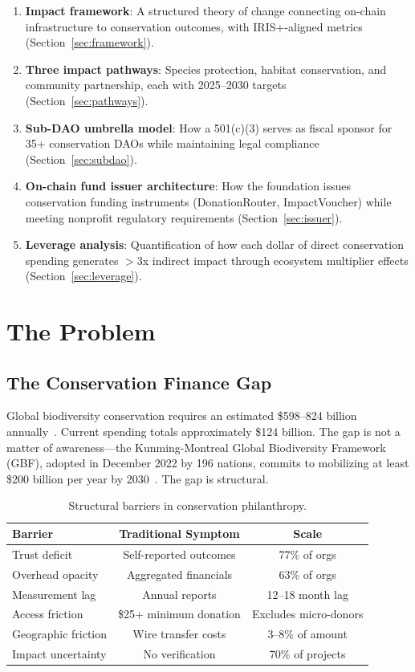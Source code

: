 \documentclass[11pt,letterpaper]{article}
\begin{document}
\begin{enumerate}
    \item \textbf{Impact framework}: A structured theory of change connecting on-chain infrastructure to conservation outcomes, with IRIS+-aligned metrics (Section~\ref{sec:framework}).
    \item \textbf{Three impact pathways}: Species protection, habitat conservation, and community partnership, each with 2025--2030 targets (Section~\ref{sec:pathways}).
    \item \textbf{Sub-DAO umbrella model}: How a 501(c)(3) serves as fiscal sponsor for 35+ conservation DAOs while maintaining legal compliance (Section~\ref{sec:subdao}).
    \item \textbf{On-chain fund issuer architecture}: How the foundation issues conservation funding instruments (DonationRouter, ImpactVoucher) while meeting nonprofit regulatory requirements (Section~\ref{sec:issuer}).
    \item \textbf{Leverage analysis}: Quantification of how each dollar of direct conservation spending generates $>$3x indirect impact through ecosystem multiplier effects (Section~\ref{sec:leverage}).
\end{enumerate}

\section{The Problem}

\subsection{The Conservation Finance Gap}

Global biodiversity conservation requires an estimated \$598--824 billion annually~\cite{paulson2020}. Current spending totals approximately \$124 billion. The gap is not a matter of awareness---the Kunming-Montreal Global Biodiversity Framework (GBF), adopted in December 2022 by 196 nations, commits to mobilizing at least \$200 billion per year by 2030~\cite{kmgbf2022}. The gap is structural.

\begin{table}[t]
\centering
\begin{tabular}{lcc}
\toprule
\textbf{Barrier} & \textbf{Traditional Symptom} & \textbf{Scale} \\
\midrule
Trust deficit & Self-reported outcomes & 77\% of orgs \\
Overhead opacity & Aggregated financials & 63\% of orgs \\
Measurement lag & Annual reports & 12--18 month lag \\
Access friction & \$25+ minimum donation & Excludes micro-donors \\
Geographic friction & Wire transfer costs & 3--8\% of amount \\
Impact uncertainty & No verification & 70\% of projects \\
\bottomrule
\end{tabular}
\caption{Structural barriers in conservation philanthropy.}
\label{tab:barriers}
\end{table}
\end{document}
